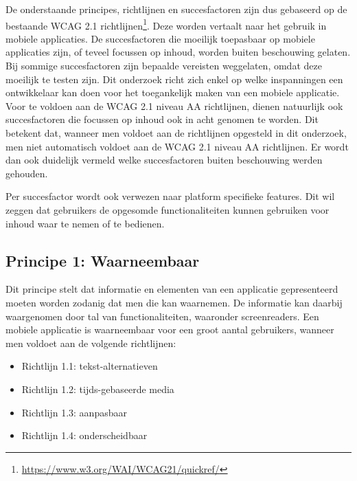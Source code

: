 De onderstaande principes, richtlijnen en succesfactoren zijn dus gebaseerd op de bestaande WCAG 2.1 richtlijnen\footnote{\url{https://www.w3.org/WAI/WCAG21/quickref/}}. Deze worden vertaalt naar het gebruik in mobiele applicaties. De succesfactoren die moeilijk toepasbaar op mobiele applicaties zijn, of teveel focussen op inhoud, worden buiten beschouwing gelaten. Bij sommige succesfactoren zijn bepaalde vereisten weggelaten, omdat deze moeilijk te testen zijn. Dit onderzoek richt zich enkel op welke inspanningen een ontwikkelaar kan doen voor het toegankelijk maken van een mobiele applicatie. Voor te voldoen aan de WCAG 2.1 niveau AA richtlijnen, dienen natuurlijk ook succesfactoren die focussen op inhoud ook in acht genomen te worden. Dit betekent dat, wanneer men voldoet aan de richtlijnen opgesteld in dit onderzoek, men niet automatisch voldoet aan de WCAG 2.1 niveau AA richtlijnen. Er wordt dan ook duidelijk vermeld welke succesfactoren buiten beschouwing werden gehouden.

Per succesfactor wordt ook verwezen naar platform specifieke features. Dit wil zeggen dat gebruikers de opgesomde functionaliteiten kunnen gebruiken voor inhoud waar te nemen of te bedienen. 

\subsection{Principe 1: Waarneembaar}
\label{sec:waarneembaarWCAG}
Dit principe stelt dat informatie en elementen van een applicatie gepresenteerd moeten worden zodanig dat men die kan waarnemen. De informatie kan daarbij waargenomen door tal van functionaliteiten, waaronder screenreaders. Een mobiele applicatie is waarneembaar voor een groot aantal gebruikers, wanneer men voldoet aan de volgende richtlijnen: \begin{itemize}
    \item Richtlijn 1.1: tekst-alternatieven
     \item Richtlijn 1.2: tijds-gebaseerde media
      \item Richtlijn 1.3: aanpasbaar
      \item Richtlijn 1.4: onderscheidbaar
\end{itemize}


